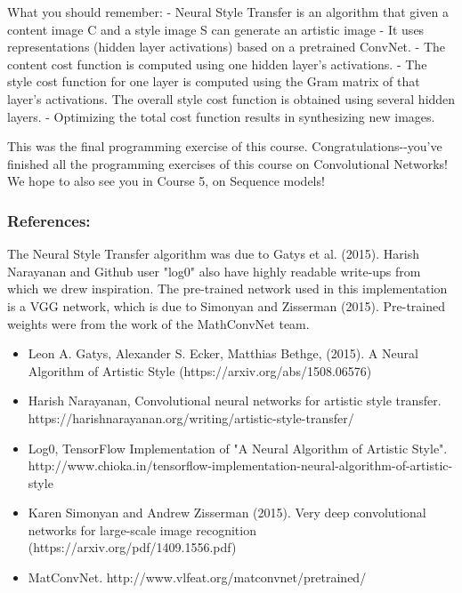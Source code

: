\documentclass[11pt]{article}
\providecommand{\tightlist}{%
      \setlength{\itemsep}{0pt}\setlength{\parskip}{0pt}}
\begin{document}
 What you should remember: - Neural Style Transfer is an algorithm that
given a content image C and a style image S can generate an artistic
image - It uses representations (hidden layer activations) based on a
pretrained ConvNet. - The content cost function is computed using one
hidden layer's activations. - The style cost function for one layer is
computed using the Gram matrix of that layer's activations. The overall
style cost function is obtained using several hidden layers. -
Optimizing the total cost function results in synthesizing new images.

    This was the final programming exercise of this course.
Congratulations-\/-you've finished all the programming exercises of this
course on Convolutional Networks! We hope to also see you in Course 5,
on Sequence models!

    \subsubsection{References:}\label{references}

The Neural Style Transfer algorithm was due to Gatys et al. (2015).
Harish Narayanan and Github user "log0" also have highly readable
write-ups from which we drew inspiration. The pre-trained network used
in this implementation is a VGG network, which is due to Simonyan and
Zisserman (2015). Pre-trained weights were from the work of the
MathConvNet team.

\begin{itemize}
\tightlist
\item
  Leon A. Gatys, Alexander S. Ecker, Matthias Bethge, (2015). A Neural
  Algorithm of Artistic Style (https://arxiv.org/abs/1508.06576)
\item
  Harish Narayanan, Convolutional neural networks for artistic style
  transfer. https://harishnarayanan.org/writing/artistic-style-transfer/
\item
  Log0, TensorFlow Implementation of "A Neural Algorithm of Artistic
  Style".
  http://www.chioka.in/tensorflow-implementation-neural-algorithm-of-artistic-style
\item
  Karen Simonyan and Andrew Zisserman (2015). Very deep convolutional
  networks for large-scale image recognition
  (https://arxiv.org/pdf/1409.1556.pdf)
\item
  MatConvNet. http://www.vlfeat.org/matconvnet/pretrained/
\end{itemize}


    
    
    
    
\end{document}
